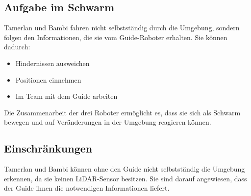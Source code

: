 \subsection{Aufgabe im Schwarm}
Tamerlan und Bambi fahren nicht selbstständig durch die Umgebung, sondern folgen den Informationen, die sie vom Guide-Roboter erhalten.
Sie können dadurch:
\begin{itemize}
    \item Hindernissen ausweichen
    \item Positionen einnehmen
    \item Im Team mit dem Guide arbeiten
\end{itemize}
Die Zusammenarbeit der drei Roboter ermöglicht es, dass sie sich als Schwarm bewegen und auf Veränderungen in der Umgebung reagieren können.
%
\subsection{ Einschränkungen}
Tamerlan und Bambi können ohne den Guide nicht selbstständig die Umgebung erkennen, da sie keinen LiDAR-Sensor besitzen. Sie sind darauf angewiesen, dass der Guide ihnen die notwendigen Informationen liefert.